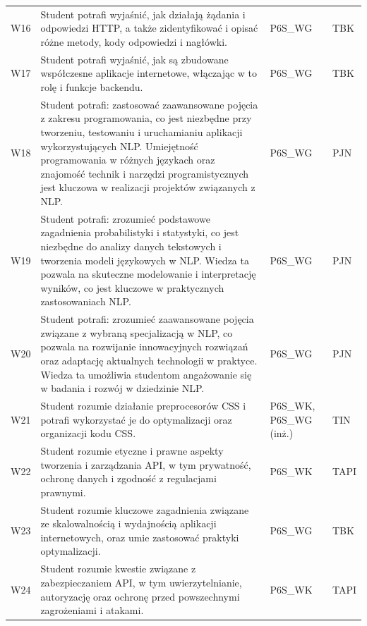 \documentclass[12pt,a4paper]{article}
\begin{document}
{\begin{longtable}{m{1cm}m{8.8cm}m{2.1cm}m{2.5cm}}
\rowcolor{tableRowAlt} W16 & Student potrafi wyjaśnić, jak działają żądania i odpowiedzi HTTP, a także zidentyfikować i opisać różne metody, kody odpowiedzi i nagłówki. & {\scriptsize P6S\_WG} & {\scriptsize TBK} \\
\rowcolor{tableRowLight} W17 & Student potrafi wyjaśnić, jak są zbudowane współczesne aplikacje internetowe, włączając w to rolę i funkcje backendu. & {\scriptsize P6S\_WG} & {\scriptsize TBK} \\
\rowcolor{tableRowAlt} W18 & Student potrafi: zastosować zaawansowane pojęcia z zakresu programowania, co jest niezbędne przy tworzeniu, testowaniu i uruchamianiu aplikacji wykorzystujących NLP. Umiejętność programowania w różnych językach oraz znajomość technik i narzędzi programistycznych jest kluczowa w realizacji projektów związanych z NLP. & {\scriptsize P6S\_WG} & {\scriptsize PJN} \\
\rowcolor{tableRowLight} W19 & Student potrafi: zrozumieć podstawowe zagadnienia probabilistyki i statystyki, co jest niezbędne do analizy danych tekstowych i tworzenia modeli językowych w NLP. Wiedza ta pozwala na skuteczne modelowanie i interpretację wyników, co jest kluczowe w praktycznych zastosowaniach NLP. & {\scriptsize P6S\_WG} & {\scriptsize PJN} \\
\rowcolor{tableRowAlt} W20 & Student potrafi: zrozumieć zaawansowane pojęcia związane z wybraną specjalizacją w NLP, co pozwala na rozwijanie innowacyjnych rozwiązań oraz adaptację aktualnych technologii w praktyce. Wiedza ta umożliwia studentom angażowanie się w badania i rozwój w dziedzinie NLP. & {\scriptsize P6S\_WG} & {\scriptsize PJN} \\
\rowcolor{tableRowLight} W21 & Student rozumie działanie preprocesorów CSS i potrafi wykorzystać je do optymalizacji oraz organizacji kodu CSS. & {\scriptsize P6S\_WK, P6S\_WG {\scriptsize (inż.)}} & {\scriptsize TIN} \\
\rowcolor{tableRowAlt} W22 & Student rozumie etyczne i prawne aspekty tworzenia i zarządzania API, w tym prywatność, ochronę danych i zgodność z regulacjami prawnymi. & {\scriptsize P6S\_WK} & {\scriptsize TAPI} \\
\rowcolor{tableRowLight} W23 & Student rozumie kluczowe zagadnienia związane ze skalowalnością i wydajnością aplikacji internetowych, oraz umie zastosować praktyki optymalizacji. & {\scriptsize P6S\_WG} & {\scriptsize TBK} \\
\rowcolor{tableRowAlt} W24 & Student rozumie kwestie związane z zabezpieczaniem API, w tym uwierzytelnianie, autoryzację oraz ochronę przed powszechnymi zagrożeniami i atakami. & {\scriptsize P6S\_WK} & {\scriptsize TAPI} \\

\end{longtable}}
\end{document}
